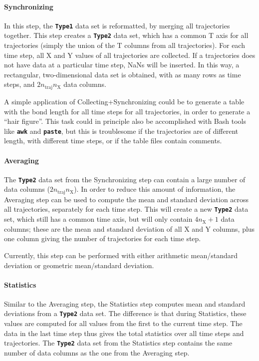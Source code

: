 \documentclass[a4paper,10pt,DIV=15,openany]{scrbook}
\newcommand{\ttt}[1]{\textbf{\texttt{#1}}}
\begin{document}
\paragraph{Synchronizing}

In this step, the \ttt{Type1} data set is reformatted, by merging all trajectories together.
This step creates a \ttt{Type2} data set, which has a common T axis for all trajectories (simply the union of the T columns from all trajectories).
For each time step, all X and Y values of all trajectories are collected.
If a trajectories does not have data at a particular time step, NaNs will be inserted.
In this way, a rectangular, two-dimensional data set is obtained, with as many rows as time steps, and $2n_\text{traj}n_\text{X}$ data columns.

A simple application of Collecting+Synchronizing could be to generate a table with the bond length for all time steps for all trajectories, in order to generate a ``hair figure''.
This task could in principle also be accomplished with Bash tools like \ttt{awk} and \ttt{paste}, but this is troublesome if the trajectories are of different length, with different time steps, or if the table files contain comments.

\paragraph{Averaging}

The \ttt{Type2} data set from the Synchronizing step can contain a large number of data columns ($2n_\text{traj}n_\text{X}$).
In order to reduce this amount of information, the Averaging step can be used to compute the mean and standard deviation across all trajectories, separately for each time step.
This will create a new \ttt{Type2} data set, which still has a common time axis, but will only contain $4n_\text{X}+1$ data columns; these are the mean and standard deviation of all X and Y columns, plus one column giving the number of trajectories for each time step.

Currently, this step can be performed with either arithmetic mean/standard deviation or geometric mean/standard deviation.

\paragraph{Statistics}

Similar to the Averaging step, the Statistics step computes mean and standard deviations from a \ttt{Type2} data set.
The difference is that during Statistics, these values are computed for all values from the first to the current time step.
The data in the last time step thus gives the total statistics over all time steps and trajectories.
The \ttt{Type2} data set from the Statistics step  contains the same number of data columns as the one from the Averaging step.
\end{document}
